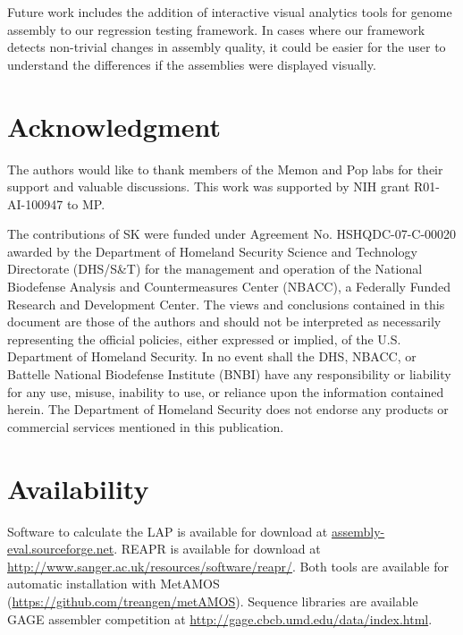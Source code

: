 Future work includes the addition of interactive visual analytics tools for genome assembly to our regression testing framework.
In cases where our framework detects non-trivial changes in assembly quality, it could be easier for the user to understand the differences if the assemblies were displayed visually.

\section{Acknowledgment}


The authors would like to thank members of the Memon and Pop labs for their support and valuable discussions.
This work was supported by NIH grant R01-AI-100947 to MP.

The contributions of SK were funded under Agreement No. HSHQDC-07-C-00020 awarded by the Department of Homeland Security Science and Technology Directorate (DHS/S\&T) for the management and operation of the National Biodefense Analysis and Countermeasures Center (NBACC), a Federally Funded Research and Development Center. The views and conclusions contained in this document are those of the authors and should not be interpreted as necessarily representing the official policies, either expressed or implied, of the U.S. Department of Homeland Security. In no event shall the DHS, NBACC, or Battelle National Biodefense Institute (BNBI) have any responsibility or liability for any use, misuse, inability to use, or reliance upon the information contained herein. The Department of Homeland Security does not endorse any products or commercial services mentioned in this publication.

\section{Availability}
Software to calculate the LAP is available for download at \url{assembly-eval.sourceforge.net}.
REAPR is available for download at \url{http://www.sanger.ac.uk/resources/software/reapr/}.
Both tools are available for automatic installation with MetAMOS (\url{https://github.com/treangen/metAMOS}).
Sequence libraries are available GAGE assembler competition at \url{http://gage.cbcb.umd.edu/data/index.html}.
